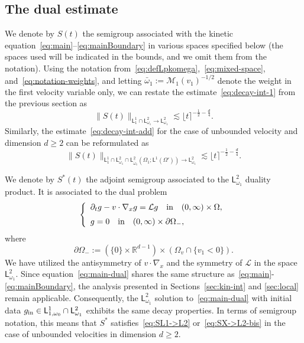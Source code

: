 \documentclass[11pt]{amsart}
\theoremstyle{definition}
\theoremstyle{remark}
\numberwithin{equation}{section}
\newcommand\R{{\mathbb R}}
\def\LL{{\mathcal L}}
\def\MMM{{\mathscr M}}
\newcommand{\sfL}{\mathsf{L}}
\newcommand{\wangle}[1]{\lfloor #1 \rceil}
\newcommand{\EB}[1]{\textcolor{blue}{[\bfseries #1]}}
\begin{document}
\subsection{The dual estimate}
\label{subsec:pw-dual}

We denote by $S(t)$ the semigroup associated with the kinetic equation~\eqref{eq:main}–\eqref{eq:mainBoundary} in various spaces specified below (the spaces used will be indicated in the bounds, and we omit them from the notation). Using the notation from~\eqref{eq:defLpkomega},~\eqref{eq:mixed-space}, and~\eqref{eq:notation-weights}, and letting $\bar \omega_1 := \MMM_1(v_1)^{-1/2}$ denote the weight in the first velocity variable only, we can restate the estimate~\eqref{eq:decay-int-1} from the previous section as
\begin{equation}
  \label{eq:SL1->L2}
  \| S(t) \|_{\sfL^{1}_{1} \cap \sfL^{2}_{\omega_1} \to \sfL^{2}_{\omega_1}} \lesssim \wangle{t}^{-\frac{1}{2} - \frac{d}{4}}.
\end{equation}
Similarly, the estimate~\eqref{eq:decay-int-add} for the case of unbounded velocity and dimension $d \geq 2$ can be reformulated as
\begin{equation}
  \label{eq:SX->L2-bis}
  \| S(t) \|_{\sfL^{1}_{1} \cap \sfL^{2}_{\omega_1} \cap \sfL^{2}_{\bar \omega_1}(\Omega_1; \sfL^{1}(\Omega')) \to \sfL^{2}_{\omega_1}} \lesssim \wangle{t}^{-\frac{1}{2} - \frac{d}{4}}.
\end{equation}

We denote by $S^*(t)$ the adjoint semigroup  associated to the $\sfL^2_{\omega_1}$ duality product. It is associated to the dual problem
\begin{equation}
  \label{eq:main-dual}
  \left\{
    \begin{array}{l}
      \partial_t g - v \cdot \nabla_x g = \mathcal L g \quad\hbox{in}\quad (0,\infty) \times \Omega,\\[2mm]
      g = 0  \quad\hbox{in}\quad (0,\infty) \times \partial\Omega_-,
    \end{array}
  \right.
\end{equation}
where
\begin{equation*}
  \partial\Omega_- := (\{0\} \times \R^{d-1}) \times (\Omega_v \cap \{v_1 < 0 \}).
\end{equation*}
We have utilized the antisymmetry of $v \cdot \nabla_x$ and the symmetry of $\LL$ in the space $\sfL^2_{\omega_1}$. Since equation~\eqref{eq:main-dual} shares the same structure as~\eqref{eq:main}-\eqref{eq:mainBoundary}, the analysis presented in Sections~\ref{sec:kin-int} and \ref{sec:local} remain applicable. Consequently, the $\sfL^2_{\omega_1}$ solution to~\eqref{eq:main-dual} with initial data $g_{\rm in} \in \sfL^{1}_{1,\omega_0} \cap \sfL^{2}_{\omega_1}$ exhibits the same decay properties. In terms of semigroup notation, this means that $S^*$ satisfies~\eqref{eq:SL1->L2} or~\eqref{eq:SX->L2-bis} in the case of unbounded velocities in dimension $d \ge 2$.
\end{document}
